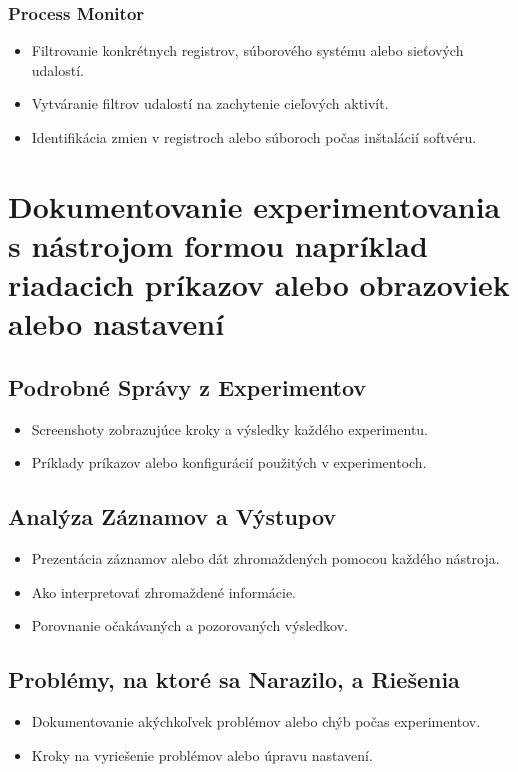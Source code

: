 \documentclass[conference]{IEEEtran}
\begin{document}
\subsubsection{Process Monitor}
\begin{itemize}
    \item Filtrovanie konkrétnych registrov, súborového systému alebo sieťových udalostí.
    \item Vytváranie filtrov udalostí na zachytenie cieľových aktivít.
    \item Identifikácia zmien v registroch alebo súboroch počas inštalácií softvéru.
\end{itemize}

\section{Dokumentovanie experimentovania s nástrojom formou napríklad riadacich príkazov alebo obrazoviek alebo nastavení}
\subsection{Podrobné Správy z Experimentov}
\begin{itemize}
    \item Screenshoty zobrazujúce kroky a výsledky každého experimentu.
    \item Príklady príkazov alebo konfigurácií použitých v experimentoch.
\end{itemize}

\subsection{Analýza Záznamov a Výstupov}
\begin{itemize}
    \item Prezentácia záznamov alebo dát zhromaždených pomocou každého nástroja.
    \item Ako interpretovať zhromaždené informácie.
    \item Porovnanie očakávaných a pozorovaných výsledkov.
\end{itemize}

\subsection{Problémy, na ktoré sa Narazilo, a Riešenia}
\begin{itemize}
    \item Dokumentovanie akýchkoľvek problémov alebo chýb počas experimentov.
    \item Kroky na vyriešenie problémov alebo úpravu nastavení.
\end{itemize}
\end{document}
